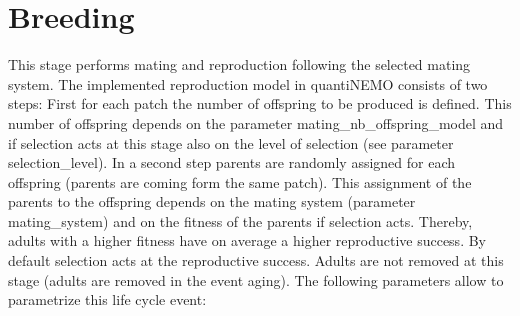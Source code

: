 \documentclass[letterpaper,12pt,oneside]{book}
\begin{document}
\chapter{Breeding}\label{chap:breeding}
This stage performs mating and reproduction following the selected mating system. The implemented reproduction model in quantiNEMO consists of two steps: First for each patch the number of offspring to be produced is defined. This number of offspring depends on the parameter \textsf{mating\_nb\_offspring\_model} and if selection acts at this stage also on the level of selection (see parameter \textsf{selection\_level}). In a second step parents are randomly assigned for each offspring (parents are coming form the same patch). This assignment of the parents to the offspring depends on the mating system (parameter \textsf{mating\_system}) and on the fitness of the parents if selection acts. Thereby, adults with a higher fitness have on average a higher reproductive success. By default selection acts at the reproductive success. Adults are not removed at this stage (adults are removed in the event \textsf{aging}). The following parameters allow to parametrize this life cycle event:
 
\end{document}
